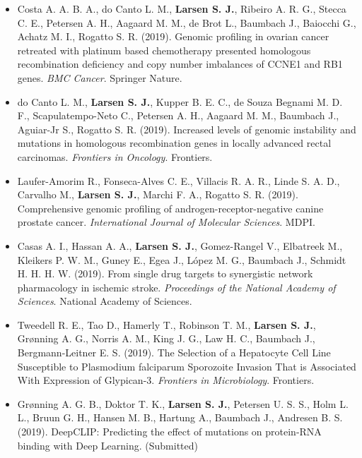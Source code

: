 \begin{itemize}
    \item Costa A. A. B. A., do Canto L. M., \textbf{Larsen S. J.}, Ribeiro A. R. G., Stecca C. E., Petersen A. H., Aagaard M. M., de Brot L., Baumbach J., Baiocchi G., Achatz M. I., Rogatto S. R. (2019). Genomic profiling in ovarian cancer retreated with platinum based chemotherapy presented homologous recombination deficiency and copy number imbalances of CCNE1 and RB1 genes. \emph{BMC Cancer}. Springer Nature.
    \item do Canto L. M., \textbf{Larsen S. J.}, Kupper B. E. C., de Souza Begnami M. D. F., Scapulatempo-Neto C., Petersen A. H., Aagaard M. M., Baumbach J., Aguiar-Jr S., Rogatto S. R. (2019). Increased levels of genomic instability and mutations in homologous recombination genes in locally advanced rectal carcinomas. \emph{Frontiers in Oncology}. Frontiers.
    \item Laufer-Amorim R., Fonseca-Alves C. E., Villacis R. A. R., Linde S. A. D., Carvalho M., \textbf{Larsen S. J.}, Marchi F. A., Rogatto S. R. (2019). Comprehensive genomic profiling of androgen-receptor-negative canine prostate cancer. \emph{International Journal of Molecular Sciences}. MDPI.
    \item Casas A. I., Hassan A. A., \textbf{Larsen S. J.}, Gomez-Rangel V., Elbatreek M., Kleikers P. W. M., Guney E., Egea J., López M. G., Baumbach J., Schmidt H. H. H. W. (2019). From single drug targets to synergistic network pharmacology in ischemic stroke. \emph{Proceedings of the National Academy of Sciences}. National Academy of Sciences.
    \item Tweedell R. E., Tao D., Hamerly T., Robinson T. M., \textbf{Larsen S. J.}, Gr\o{}nning A. G., Norris A. M., King J. G., Law H. C., Baumbach J., Bergmann-Leitner E. S. (2019). The Selection of a Hepatocyte Cell Line Susceptible to Plasmodium falciparum Sporozoite Invasion That is Associated With Expression of Glypican-3. \emph{Frontiers in Microbiology}. Frontiers.
    \item Grønning A. G. B., Doktor T. K., \textbf{Larsen S. J.}, Petersen U. S. S., Holm L. L., Bruun G. H., Hansen M. B., Hartung A., Baumbach J., Andresen B. S. (2019). DeepCLIP: Predicting the effect of mutations on protein-RNA binding with Deep Learning. (Submitted)
\end{itemize}
